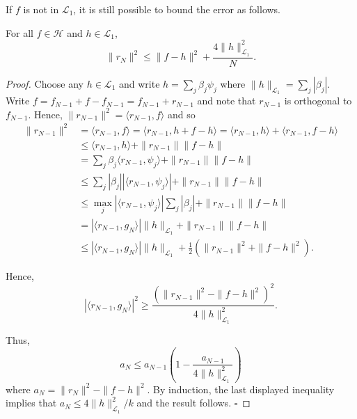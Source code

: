   If $f$ is not in $\mathcal{L}_1$, it is still possible to bound the error as follows.

  \begin{theorem}
    \label{thm:residual-bound-for-greedy-approximation}
    For all $f \in \mathcal{H}$ and $h \in \mathcal{L}_1$,
    \begin{equation}
      \|r_N\|^2 \leq \|f - h\|^2 + \frac{4\|h\|_{\mathcal{L}_1}^2}{N}. \tag{6}
    \end{equation}
  \end{theorem}
  \begin{proof}
    Choose any $h \in \mathcal{L}_1$ and write $h = \sum_j \beta_j \psi_j$ where $\|h\|_{\mathcal{L}_1} = \sum_j |\beta_j|$. Write $f = f_{N-1} + f - f_{N-1} = f_{N-1} + r_{N-1}$ and note that $r_{N-1}$ is orthogonal to $f_{N-1}$. Hence, $\|r_{N-1}\|^2 = \langle r_{N-1}, f \rangle$ and so
    \begin{align}
      \|r_{N-1}\|^2 &= \langle r_{N-1}, f \rangle = \langle r_{N-1}, h + f - h \rangle = \langle r_{N-1}, h \rangle + \langle r_{N-1}, f - h \rangle \\
      &\leq \langle r_{N-1}, h \rangle + \|r_{N-1}\| \|f - h\| \\
      &= \sum_j \beta_j \langle r_{N-1}, \psi_j \rangle + \|r_{N-1}\| \|f - h\| \\
      &\leq \sum_j |\beta_j| |\langle r_{N-1}, \psi_j \rangle| + \|r_{N-1}\| \|f - h\| \\
      &\leq \max_j |\langle r_{N-1}, \psi_j \rangle| \sum_j |\beta_j| + \|r_{N-1}\| \|f - h\| \\
      &= |\langle r_{N-1}, g_N \rangle| \|h\|_{\mathcal{L}_1} + \|r_{N-1}\| \|f - h\| \\
      &\leq |\langle r_{N-1}, g_N \rangle| \|h\|_{\mathcal{L}_1} + \frac{1}{2} (\|r_{N-1}\|^2 + \|f - h\|^2).
    \end{align}

    Hence,
    \begin{equation}
      |\langle r_{N-1}, g_N \rangle|^2 \geq \frac{(\|r_{N-1}\|^2 - \|f - h\|^2)^2}{4\|h\|_{\mathcal{L}_1}^2}.
    \end{equation}

    Thus,
    \begin{equation}
      a_N \leq a_{N-1} \left( 1 - \frac{a_{N-1}}{4\|h\|_{\mathcal{L}_1}^2} \right)
    \end{equation}
    where $a_N = \|r_N\|^2 - \|f - h\|^2$. By induction, the last displayed inequality implies that $a_N \leq 4\|h\|_{\mathcal{L}_1}^2/k$ and the result follows. $\square$
  \end{proof}

